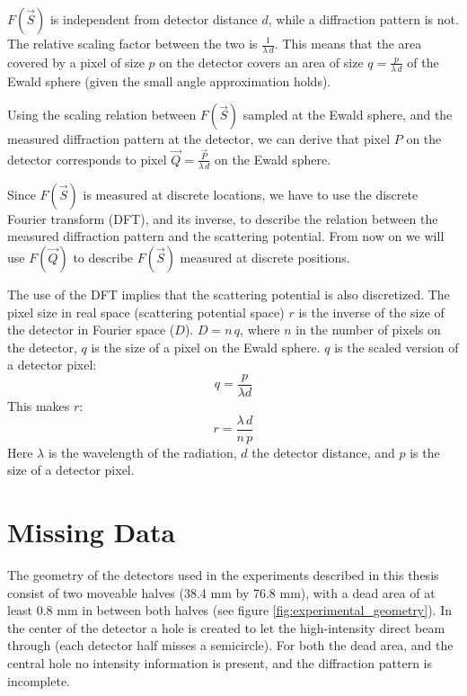 $F(\vec{S})$ is independent from detector distance $d$, while a diffraction pattern is not. The relative scaling factor between the two is $\frac{1}{\lambda\,d}$. This means that the area covered by a pixel of size $p$ on the detector covers an area of size $q = \frac{p}{\lambda \, d}$ of the Ewald sphere (given the small angle approximation holds). 

Using the scaling relation between $F(\vec{S})$ sampled at the Ewald sphere, and the measured diffraction pattern at the detector, we can derive that pixel $P$ on the detector corresponds to pixel $\vec{Q} = \frac{\vec{P}}{\lambda\,d}$ on the Ewald sphere. 

Since $F(\vec{S})$ is measured at discrete locations, we have to use the discrete Fourier transform (DFT), and its inverse, to describe the relation between the measured diffraction pattern and the scattering potential. From now on we will use $F(\vec{Q})$ to describe $F(\vec{S})$ measured at discrete positions. 

The use of the DFT implies that the scattering potential is also discretized. The pixel size in real space (scattering potential space) $r$ is the inverse of the size of the detector in Fourier space ($D$). $D = n\,q$, where $n$ in the number of pixels on the detector, $q$ is the size of a pixel on the Ewald sphere. $q$ is the scaled version of a detector pixel: 
\begin{equation}\label{eq:q}
q = \frac{p}{\lambda d}
\end{equation}
This makes $r$:
\begin{equation}
r = \frac{\lambda\,d}{n\,p}
\end{equation}
Here $\lambda$ is the wavelength of the radiation, $d$ the detector distance, and $p$ is the size of a detector pixel.


\section{Missing Data}
The geometry of the detectors used in the experiments described in this thesis consist of two moveable halves (38.4 mm by 76.8 mm), with a dead area of at least 0.8 mm in between both halves (see figure \ref{fig:experimental_geometry}). In the center of the
detector a hole is created to let the high-intensity direct beam through (each detector half misses a semicircle). For both the dead area, and the central hole no intensity information is present, and the diffraction pattern is incomplete. 

